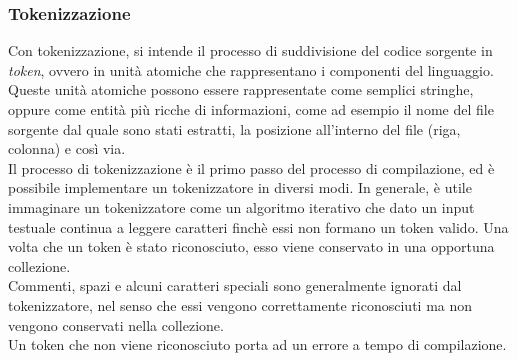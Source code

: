 \subsubsection{Tokenizzazione}
Con tokenizzazione, si intende il processo di suddivisione del codice sorgente in \textit{token}, ovvero in unità 
atomiche che rappresentano i componenti del linguaggio. Queste unità atomiche possono essere rappresentate come 
semplici stringhe, oppure come entità più ricche di informazioni, come ad esempio il nome del file sorgente dal quale
sono stati estratti, la posizione all'interno del file (riga, colonna) e così via.\\

Il processo di tokenizzazione è il primo passo del processo di compilazione, ed è possibile implementare un tokenizzatore
in diversi modi. In generale, è utile immaginare un tokenizzatore come un algoritmo iterativo che dato un input testuale
continua a leggere caratteri finchè essi non formano un token valido. Una volta che un token è stato riconosciuto, 
esso viene conservato in una opportuna collezione. \\

Commenti, spazi e alcuni caratteri speciali sono generalmente ignorati dal tokenizzatore, nel senso che essi 
vengono correttamente riconosciuti ma non vengono conservati nella collezione. \\

Un token che non viene riconosciuto porta ad un errore a tempo di compilazione. 